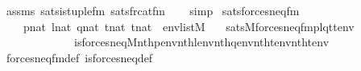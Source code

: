 \begin{isabellebody}
\ assms\ sats{\isacharunderscore}{\kern0pt}is{\isacharunderscore}{\kern0pt}tuple{\isacharunderscore}{\kern0pt}fm\ sats{\isacharunderscore}{\kern0pt}frc{\isacharunderscore}{\kern0pt}at{\isacharunderscore}{\kern0pt}fm\isanewline
\ \ \isamarkupfalse%
\ simp%
\endisatagproof
{\isafoldproof}%
%
\isadelimproof
\isanewline
%
\endisadelimproof
\isanewline
{}\isamarkupfalse%
\ sats{\isacharunderscore}{\kern0pt}forces{\isacharunderscore}{\kern0pt}neq{\isacharprime}{\kern0pt}{\isacharunderscore}{\kern0pt}fm{\isacharcolon}{\kern0pt}\isanewline
\ \ \ \ {\isachardoublequoteopen}p{\isasymin}nat{\isachardoublequoteclose}\ {\isachardoublequoteopen}l{\isasymin}nat{\isachardoublequoteclose}\ {\isachardoublequoteopen}q{\isasymin}nat{\isachardoublequoteclose}\ {\isachardoublequoteopen}t{}{\isasymin}nat{\isachardoublequoteclose}\ {\isachardoublequoteopen}t{}{\isasymin}nat{\isachardoublequoteclose}\ \ {\isachardoublequoteopen}env{\isasymin}list{\isacharparenleft}{\kern0pt}M{\isacharparenright}{\kern0pt}{\isachardoublequoteclose}\isanewline
\ \ \ {\isachardoublequoteopen}sats{\isacharparenleft}{\kern0pt}M{\isacharcomma}{\kern0pt}forces{\isacharunderscore}{\kern0pt}neq{\isacharunderscore}{\kern0pt}fm{\isacharparenleft}{\kern0pt}p{\isacharcomma}{\kern0pt}l{\isacharcomma}{\kern0pt}q{\isacharcomma}{\kern0pt}t{}{\isacharcomma}{\kern0pt}t{}{\isacharparenright}{\kern0pt}{\isacharcomma}{\kern0pt}env{\isacharparenright}{\kern0pt}\ {\isasymlongleftrightarrow}\isanewline
\ \ \ \ \ \ \ \ \ \ \ \ \ is{\isacharunderscore}{\kern0pt}forces{\isacharunderscore}{\kern0pt}neq{\isacharprime}{\kern0pt}{\isacharparenleft}{\kern0pt}{\isacharhash}{\kern0pt}{\isacharhash}{\kern0pt}M{\isacharcomma}{\kern0pt}nth{\isacharparenleft}{\kern0pt}p{\isacharcomma}{\kern0pt}env{\isacharparenright}{\kern0pt}{\isacharcomma}{\kern0pt}nth{\isacharparenleft}{\kern0pt}l{\isacharcomma}{\kern0pt}env{\isacharparenright}{\kern0pt}{\isacharcomma}{\kern0pt}nth{\isacharparenleft}{\kern0pt}q{\isacharcomma}{\kern0pt}env{\isacharparenright}{\kern0pt}{\isacharcomma}{\kern0pt}nth{\isacharparenleft}{\kern0pt}t{}{\isacharcomma}{\kern0pt}env{\isacharparenright}{\kern0pt}{\isacharcomma}{\kern0pt}nth{\isacharparenleft}{\kern0pt}t{}{\isacharcomma}{\kern0pt}env{\isacharparenright}{\kern0pt}{\isacharparenright}{\kern0pt}{\isachardoublequoteclose}\isanewline
%
\isadelimproof
\ \ %
\endisadelimproof
%
\isatagproof
{}\isamarkupfalse%
\ forces{\isacharunderscore}{\kern0pt}neq{\isacharunderscore}{\kern0pt}fm{\isacharunderscore}{\kern0pt}def\ is{\isacharunderscore}{\kern0pt}forces{\isacharunderscore}{\kern0pt}neq{\isacharprime}{\kern0pt}{\isacharunderscore}{\kern0pt}def\isanewline

\end{isabellebody}
